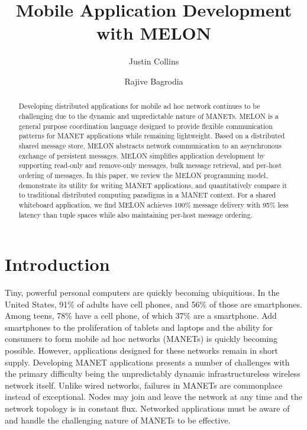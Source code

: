 \documentclass{llncs}
\begin{document}
%
\title{Mobile Application Development with MELON}
%
\author{Justin Collins \and Rajive Bagrodia}
%
%

\maketitle

\begin{abstract}
Developing distributed applications for mobile ad hoc network continues to be challenging due to the dynamic and unpredictable nature of MANETs. MELON is a general purpose coordination language designed to provide flexible communication patterns for MANET applications while remaining lightweight. Based on a distributed shared message store, MELON abstracts network communication to an asynchronous exchange of persistent messages. MELON simplifies application development by supporting read-only and remove-only messages, bulk message retrieval, and per-host ordering of messages. In this paper, we review the MELON programming model, demonstrate its utility for writing MANET applications, and quantitatively compare it to traditional distributed computing paradigms in a MANET context. For a shared whiteboard application, we find MELON achieves 100\% message delivery with 95\% less latency than tuple spaces while also maintaining per-host message ordering.
\end{abstract}

\section{Introduction}

Tiny, powerful personal computers are quickly becoming ubiquitious. In the United States, 91\% of adults have cell phones, and 56\% of those are smartphones\cite{cellphones}. Among teens, 78\% have a cell phone, of which 37\% are a smartphone\cite{teenphones}. Add smartphones to the proliferation of tablets and laptops and the ability for consumers to form mobile ad hoc networks (MANETs) is quickly becoming possible. However, applications designed for these networks remain in short supply. Developing MANET applications presents a number of challenges with the primary difficulty being the unpredictably dynamic infrastructureless wireless network itself. Unlike wired networks, failures in MANETs are commonplace instead of exceptional. Nodes may join and leave the network at any time and the network topology is in constant flux. Networked applications must be aware of and handle the challenging nature of MANETs to be effective.
\end{document}
